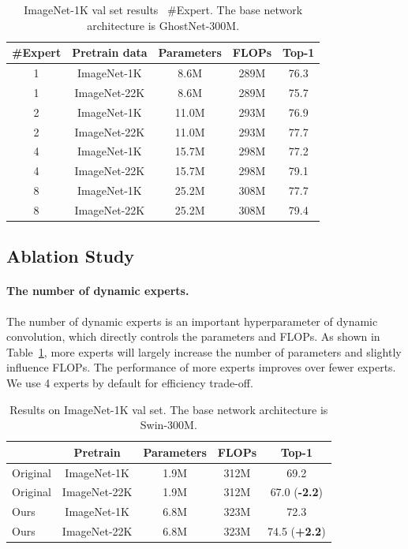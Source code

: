 \documentclass[10pt,twocolumn,letterpaper]{article}
\begin{document}
\begin{table}[htb]
	\centering
	\small
	\renewcommand\arraystretch{1.1}
	\caption{ImageNet-1K val set results \wrt~\#Expert. The base network architecture is GhostNet-300M.}
	\label{tab:expert}
	\begin{tabular}{c|c|ccc}
		\toprule[1pt]
		\#Expert & Pretrain data  & Parameters & FLOPs & Top-1  \\
		\midrule
		1 & ImageNet-1K &  8.6M & 289M & 76.3 \\
		1 & ImageNet-22K &  8.6M & 289M & 75.7 \\
		\midrule
		2 & ImageNet-1K &  11.0M & 293M & 76.9 \\
		2 & ImageNet-22K &  11.0M & 293M & 77.7 \\
		\midrule
		4 & ImageNet-1K &  15.7M & 298M & 77.2 \\
		4 & ImageNet-22K &  15.7M & 298M & 79.1 \\
		\midrule
		8 & ImageNet-1K &  25.2M & 308M & 77.7 \\
		8 & ImageNet-22K &  25.2M & 308M & 79.4 \\
		\bottomrule[1pt]
	\end{tabular}	
\end{table}


\subsection{Ablation Study}
\paragraph{The number of dynamic experts.}
The number of dynamic experts is an important hyperparameter of dynamic convolution, which directly controls the parameters and FLOPs. As shown in Table~\ref{tab:expert}, more experts will largely increase the number of parameters and slightly influence FLOPs. The performance of more experts improves over fewer experts. We use 4 experts by default for efficiency trade-off.


\begin{table}[htb]
	\centering
	\small
	\renewcommand\arraystretch{1.1}
	\caption{Results on ImageNet-1K val set. The base network architecture is Swin-300M.}
	\label{tab:swin}
	\setlength{\tabcolsep}{4pt}
	\begin{tabular}{l|c|ccc}
		\toprule[1.5pt]
		& Pretrain & Parameters & FLOPs & Top-1  \\
		\midrule
		Original & ImageNet-1K &  1.9M & 312M & 69.2 \\
		Original & ImageNet-22K &  1.9M & 312M & 67.0 (\textbf{\color{red}-2.2}) \\
		Ours & ImageNet-1K &  6.8M & 323M & 72.3 \\
		Ours & ImageNet-22K &  6.8M & 323M & 74.5 (\textbf{\color{green}+2.2}) \\
		\bottomrule[1pt]
	\end{tabular}	
\end{table}
\end{document}
